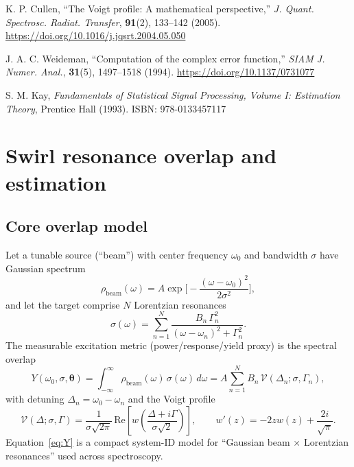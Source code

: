 \documentclass[aip,jap,preprint,amsmath,amssymb]{revtex4-2} %
\begin{document}
% 
        \begin{thebibliography}{9}

            K. P. Cullen, “The Voigt profile: A mathematical perspective,”
            \emph{J. Quant. Spectrosc. Radiat. Transfer}, \textbf{91}(2), 133–142 (2005).
            \url{https://doi.org/10.1016/j.jqsrt.2004.05.050}

            J. A. C. Weideman, “Computation of the complex error function,”
            \emph{SIAM J. Numer. Anal.}, \textbf{31}(5), 1497–1518 (1994).
            \url{https://doi.org/10.1137/0731077}

            S. M. Kay, \emph{Fundamentals of Statistical Signal Processing, Volume I: Estimation Theory},
            Prentice Hall (1993). ISBN: 978-0133457117

        \end{thebibliography}


    \appendix
\section{Swirl resonance overlap and estimation}\label{app:swirl_resonance}

    \subsection{Core overlap model}
        Let a tunable source (``beam'') with center frequency $\omega_0$ and bandwidth $\sigma$ have Gaussian spectrum
        \begin{equation}
            \rho_{\mathrm{beam}}(\omega)=A\exp\!\Big[-\frac{(\omega-\omega_0)^2}{2\sigma^2}\Big],
        \end{equation}
        and let the target comprise $N$ Lorentzian resonances
        \begin{equation}
            \sigma(\omega)=\sum_{n=1}^N \frac{B_n\,\Gamma_n^2}{(\omega-\omega_n)^2+\Gamma_n^2}.
        \end{equation}
        The measurable excitation metric (power/response/yield proxy) is the spectral overlap
        \begin{equation}
            Y(\omega_0,\sigma,\boldsymbol{\theta})
            =\int_{-\infty}^{\infty}\rho_{\mathrm{beam}}(\omega)\,\sigma(\omega)\,d\omega
            = A\sum_{n=1}^N B_n\,\mathcal{V}\!\left(\Delta_n;\sigma,\Gamma_n\right),
            \label{eq:Y}
        \end{equation}
        with detuning $\Delta_n=\omega_0-\omega_n$ and the Voigt profile
        \begin{equation}
            \mathcal{V}(\Delta;\sigma,\Gamma)=\frac{1}{\sigma\sqrt{2\pi}}\,
            \mathrm{Re}\!\left[w\!\left(\frac{\Delta+i\Gamma}{\sigma\sqrt{2}}\right)\right],
            \qquad
            w'(z)=-2zw(z)+\frac{2i}{\sqrt{\pi}}.
            \label{eq:voigt}
        \end{equation}
        Equation~\eqref{eq:Y} is a compact system-ID model for ``Gaussian beam $\times$ Lorentzian resonances'' used across spectroscopy.
\end{document}
